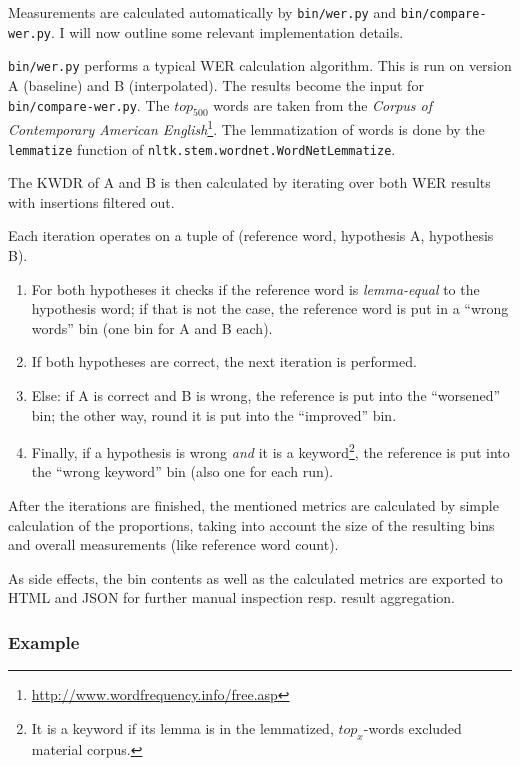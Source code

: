 \documentclass[]{article}
\begin{document}
Measurements are calculated automatically by \texttt{bin/wer.py} and
\texttt{bin/compare-wer.py}. I will now outline some relevant
implementation details.

\texttt{bin/wer.py} performs a typical WER calculation algorithm. This
is run on version A (baseline) and B (interpolated). The results become
the input for \texttt{bin/compare-wer.py}. The \(top_{500}\) words are
taken from the \emph{Corpus of Contemporary American English}\footnote{\url{http://www.wordfrequency.info/free.asp}}.
The lemmatization of words is done by the \texttt{lemmatize} function of
\texttt{nltk.stem.wordnet.WordNetLemmatize}.

The KWDR of A and B is then calculated by iterating over both WER
results with insertions filtered out.

Each iteration operates on a tuple of (reference word, hypothesis A,
hypothesis B).

\begin{enumerate}
\def\labelenumi{\arabic{enumi}.}
\item
  For both hypotheses it checks if the reference word is
  \emph{lemma-equal} to the hypothesis word; if that is not the case,
  the reference word is put in a ``wrong words'' bin (one bin for A and
  B each).
\item
  If both hypotheses are correct, the next iteration is performed.
\item
  Else: if A is correct and B is wrong, the reference is put into the
  ``worsened'' bin; the other way, round it is put into the ``improved''
  bin.
\item
  Finally, if a hypothesis is wrong \emph{and} it is a keyword\footnote{It
    is a keyword if its lemma is in the lemmatized, \(top_x\)-words
    excluded material corpus.}, the reference is put into the ``wrong
  keyword'' bin (also one for each run).
\end{enumerate}

After the iterations are finished, the mentioned metrics are calculated
by simple calculation of the proportions, taking into account the size
of the resulting bins and overall measurements (like reference word
count).

As side effects, the bin contents as well as the calculated metrics are
exported to HTML and JSON for further manual inspection resp. result
aggregation.

\subsubsection{Example}\label{example}
\end{document}
